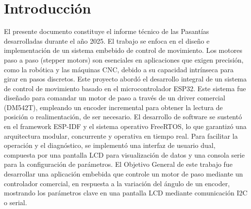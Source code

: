 %
%

\chapter{Introducción}\label{chap:introducao}

\noindent El presente documento constituye el informe técnico de las Pasantías desarrolladas durante el año 2025. El trabajo se enfoca en el diseño e implementación de un sistema embebido de control de movimiento. Los motores paso a paso (stepper motors) son esenciales en aplicaciones que exigen precisión, como la robótica y las máquinas CNC, debido a su capacidad intrínseca para girar en pasos discretos. Este proyecto abordó el desarrollo integral de un sistema de control de movimiento basado en el microcontrolador ESP32. Este sistema fue diseñado para comandar un motor de paso a través de un driver comercial (DM542T), empleando un encoder incremental para obtener la lectura de posición o realimentación, de ser necesario. El desarrollo de software se sustentó en el framework ESP-IDF y el sistema operativo FreeRTOS, lo que garantizó una arquitectura modular, concurrente y operativa en tiempo real. Para facilitar la operación y el diagnóstico, se implementó una interfaz de usuario dual, compuesta por una pantalla LCD para visualización de datos y una consola serie para la configuración de parámetros. El Objetivo General de este trabajo fue desarrollar una aplicación embebida que controle un motor de paso mediante un controlador comercial, en respuesta a la variación del ángulo de un encoder, mostrando los parámetros clave en una pantalla LCD mediante comunicación I2C o serial.

